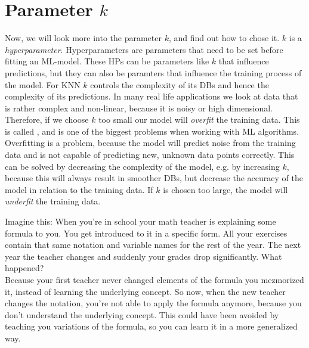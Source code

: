 \section{Parameter $k$}
Now, we will look more into the parameter $k$, and find out how to chose it.
$k$ is a \textit{hyperparameter}.
Hyperparameters are parameters that need to be set before fitting an ML-model.
These HPs can be parameters like $k$ that influence predictions, but they can also be paramters that influence the training process of the model.
For KNN $k$ controls the complexity of its DBs and hence the complexity of its predictions.
In many real life applications we look at data that is rather complex and non-linear, because it is noisy or high dimensional.
Therefore, if we choose $k$ too small our model will \textit{overfit} the training data.
This is called , and is one of the biggest problems when working with ML algorithms.
Overfitting is a problem, because the model will predict noise from the training data and is not capable of predicting new, unknown data points correctly.
This can be solved by decreasing the complexity of the model, e.g. by increasing $k$, because this will always
result in smoother DBs, but decrease the accuracy of the model in relation to the training data.
If $k$ is chosen too large, the model will \textit{underfit} the training data.

Imagine this: When you're in school your math teacher is explaining some formula to you. You get introduced to it in a specific form.
All your exercises contain that same notation and variable names for the rest of the year.
The next year the teacher changes and suddenly your grades drop significantly. What happened?\\
Because your first teacher never changed elements of the formula you mezmorized it, instead of learning the underlying concept.
So now, when the new teacher changes the notation, you're not able to apply the formula anymore, because you don't understand the underlying concept.
This could have been avoided by teaching you variations of the formula, so you can learn it in a more generalized way.

